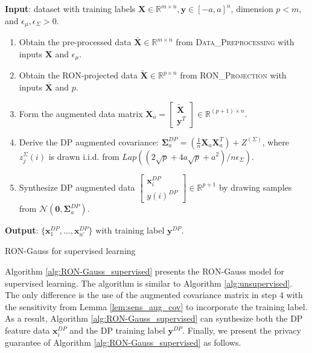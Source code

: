 \documentclass[USenglish,oneside,twocolumn]{article}
\newcommand{\noun}[1]{\textsc{#1}}
\theoremstyle{definition}
\theoremstyle{remark}
\theoremstyle{plain}
\theoremstyle{plain}
\begin{document}
\begin{algorithm}[t]
{\small \par
\textbf{Input}{: dataset with training labels $\mathbf{X}\in\mathbb{R}^{m\times n},\mathbf{y}\in[-a,a]^{n}$,
dimension $p<m$, and $\epsilon_{\mu},\epsilon_{\Sigma}>0$. \vspace{0.5em}
}{ \par}
\begin{enumerate}
\item {Obtain the pre-processed data $\bar{\mathbf{X}}\in\mathbb{R}^{m\times n}$
from }\noun{Data\_Preprocessing}{ with inputs $\mathbf{X}$
and $\epsilon_{\mu}$.}{ \par}
\item {Obtain the RON-projected data $\widetilde{\mathbf{X}}\in\mathbb{R}^{p\times n}$
from }\noun{RON\_Projection}{ with inputs $\bar{\mathbf{X}}$
and $p$.}{ \par}
\item Form the augmented data matrix $\mathbf{X}_{a}=\begin{bmatrix}\widetilde{\mathbf{X}}\\
\mathbf{y}^{T}
\end{bmatrix}\in\mathbb{R}^{(p+1)\times n}$.
\item {Derive the DP augmented covariance: $\boldsymbol{\Sigma}_{a}^{DP}=(\frac{1}{n}\mathbf{X}_{a}\mathbf{X}_{a}^{T})+Z^{(\Sigma)}$,
where $z_{j}^{\Sigma}(i)$ is drawn i.i.d. from $Lap((2\sqrt{p}+4a\sqrt{p}+a^{2})/n\epsilon_{\Sigma})$.}{\par}
\item {Synthesize DP augmented data $\left[\begin{array}{c}
\mathbf{x}_{i}^{DP}\\
y(i)^{DP}
\end{array}\right]\in\mathbb{R}^{p+1}$ by drawing samples from $\mathcal{N}(\mathbf{0},\boldsymbol{\Sigma}_{a}^{DP})$.
\vspace{-0.5em}
}{\par}
\end{enumerate}
\textbf{Output}{: $\{\mathbf{x}_{1}^{DP},\ldots,\mathbf{x}_{n'}^{DP}\}$
with training label $\mathbf{y}^{DP}$. }
}
\caption{RON-Gauss for supervised learning \label{alg:RON-Gauss_supervised}}
\end{algorithm}


Algorithm \ref{alg:RON-Gauss_supervised} presents the RON-Gauss model
for supervised learning. The algorithm is similar to Algorithm
\ref{alg:unsupervised}. The only difference is the use of the augmented
covariance matrix in step 4 with the sensitivity from Lemma \ref{lem:sens_aug_cov} to incorporate the training label. As a result, Algorithm
\ref{alg:RON-Gauss_supervised} can synthesize both the DP feature
data $\mathbf{x}_{i}^{DP}$ and the DP training label $\mathbf{y}^{DP}$.
Finally, we present the privacy guarantee of Algorithm \ref{alg:RON-Gauss_supervised} as follows.
\end{document}
